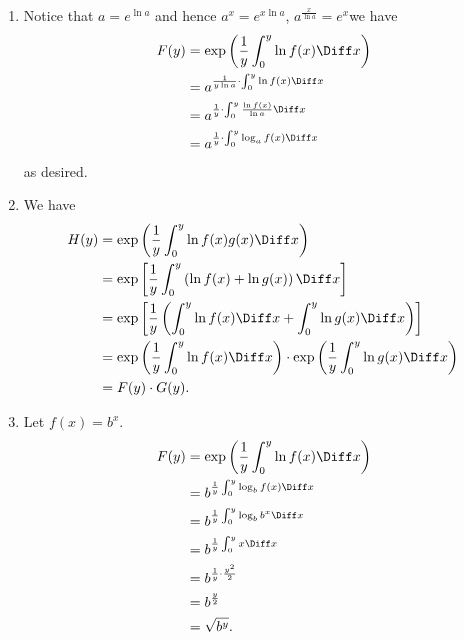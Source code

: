 \Question{\currfilebase}

\begin{enumerate}
    \item Notice that \(a = e^{\ln a}\) and hence \(a^x = e^{x \ln a}\), \(a^{\frac{x}{\ln a}} = e^x\)we have
          \begin{align*}
              F(y) & = \exp \left(\frac{1}{y} \int_0^y \ln f(x) \Diff x\right)       \\
                   & = a^{\frac{1}{y \ln a} \cdot \int_0^y \ln f(x) \Diff x}         \\
                   & = a^{\frac{1}{y} \cdot \int_0^y \frac{\ln f(x)}{\ln a} \Diff x} \\
                   & = a^{\frac{1}{y} \cdot \int_0^y \log_a f(x) \Diff x}
          \end{align*}
          as desired.

    \item We have
          \begin{align*}
              H(y) & = \exp \left(\frac{1}{y} \int_0^y \ln f(x) g(x) \Diff x\right)                                                          \\
                   & = \exp \left[\frac{1}{y} \int_0^y \left(\ln f(x) + \ln g(x)\right) \Diff x\right]                                       \\
                   & = \exp \left[\frac{1}{y} \left(\int_0^y \ln f(x) \Diff x + \int_0^y \ln g(x) \Diff x\right)\right]                      \\
                   & = \exp \left(\frac{1}{y} \int_0^y \ln f(x) \Diff x\right) \cdot \exp \left(\frac{1}{y} \int_0^y \ln g(x) \Diff x\right) \\
                   & = F(y) \cdot G(y).
          \end{align*}

    \item Let \(f(x) = b^x\).
          \begin{align*}
              F(y) & = \exp \left(\frac{1}{y} \int_0^y \ln f(x) \Diff x\right) \\
                   & = b^{\frac{1}{y} \int_0^y \log_b f(x) \Diff x}            \\
                   & = b^{\frac{1}{y} \int_0^y \log_b b^x \Diff x}             \\
                   & = b^{\frac{1}{y} \int_0^y x \Diff x}                      \\
                   & = b^{\frac{1}{y} \cdot \frac{y^2}{2}}                     \\
                   & = b^{\frac{y}{2}}                                         \\
                   & = \sqrt{b^y}.
          \end{align*}


\end{enumerate}
